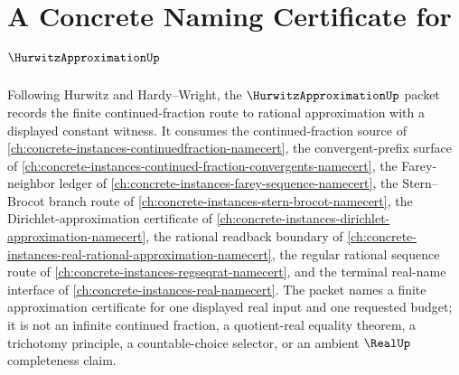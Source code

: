 \chapter{A Concrete Naming Certificate for $\HurwitzApproximationUp$}
\label{ch:concrete-instances-hurwitz-approximation-namecert}

Following Hurwitz and Hardy--Wright, the $\HurwitzApproximationUp$ packet records the finite continued-fraction route to rational approximation with a displayed constant witness. It consumes the continued-fraction source of \autoref{ch:concrete-instances-continuedfraction-namecert}, the convergent-prefix surface of \autoref{ch:concrete-instances-continued-fraction-convergents-namecert}, the Farey-neighbor ledger of \autoref{ch:concrete-instances-farey-sequence-namecert}, the Stern--Brocot branch route of \autoref{ch:concrete-instances-stern-brocot-namecert}, the Dirichlet-approximation certificate of \autoref{ch:concrete-instances-dirichlet-approximation-namecert}, the rational readback boundary of \autoref{ch:concrete-instances-real-rational-approximation-namecert}, the regular rational sequence route of \autoref{ch:concrete-instances-regseqrat-namecert}, and the terminal real-name interface of \autoref{ch:concrete-instances-real-namecert}. The packet names a finite approximation certificate for one displayed real input and one requested budget; it is not an infinite continued fraction, a quotient-real equality theorem, a trichotomy principle, a countable-choice selector, or an ambient $\RealUp$ completeness claim.

